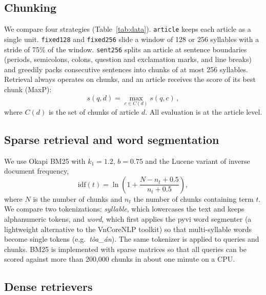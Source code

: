 \documentclass{ws-vjcs}
\begin{document}
\subsection{Chunking}

We compare four strategies (Table~\ref{tab:data}). \texttt{article} keeps each article as a single unit. \texttt{fixed128} and \texttt{fixed256} slide a window of 128 or 256 syllables with a stride of 75\% of the window. \texttt{sent256} splits an article at sentence boundaries (periods, semicolons, colons, question and exclamation marks, and line breaks) and greedily packs consecutive sentences into chunks of at most 256 syllables. Retrieval always operates on chunks, and an article receives the score of its best chunk (MaxP):\cite{dai2019maxp}
\begin{equation}
s(q, d) = \max_{c \in C(d)} s(q, c)\,,
\label{eq:maxp}
\end{equation}
where $C(d)$ is the set of chunks of article $d$. All evaluation is at the article level.

\subsection{Sparse retrieval and word segmentation}

We use Okapi BM25\cite{robertson2009bm25} with $k_1 = 1.2$, $b = 0.75$ and the Lucene variant of inverse document frequency,
\begin{equation}
\mathrm{idf}(t) = \ln\!\left(1 + \frac{N - n_t + 0.5}{n_t + 0.5}\right),
\label{eq:idf}
\end{equation}
where $N$ is the number of chunks and $n_t$ the number of chunks containing term $t$. We compare two tokenizations: \emph{syllable}, which lowercases the text and keeps alphanumeric tokens, and \emph{word}, which first applies the pyvi word segmenter\cite{pyvi} (a lightweight alternative to the VnCoreNLP toolkit\cite{vu2018vncorenlp}) so that multi-syllable words become single tokens (e.g.~\emph{t\`oa\_\'an}). The same tokenizer is applied to queries and chunks. BM25 is implemented with sparse matrices so that all queries can be scored against more than 200,000 chunks in about one minute on a CPU.

\subsection{Dense retrievers}
\end{document}
